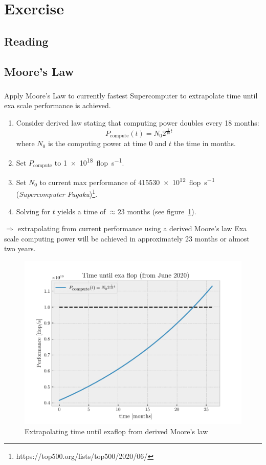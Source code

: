 \documentclass[]{scrartcl}
\newcommand{\exercise}{Exercise \thesection}
\begin{document}
\section*{\exercise}
\subsection{Reading}
\subsection{Moore's Law}
\subsubsection{}
Apply Moore's Law to currently fastest Supercomputer to extrapolate time until exa
scale performance is achieved.
\begin{enumerate}
	\item Consider derived law stating that computing power doubles every 18 months:
	\begin{equation}
		P_{\textrm{compute}}(t) = N_0 2^{\frac{1}{18} t}
	\end{equation}
	where $ N_0 $ is the computing power at time 0 and $ t $ the time in months.
	\item Set $ P_{\textrm{compute}} $ to \SI{1e18}{flop\per\second}.
	\item Set $ N_0 $ to current max performance of \SI{415530e12}{flop\per\second}
	(\emph{Supercomputer Fugaku})\footnote{https://top500.org/lists/top500/2020/06/}.
\item Solving for $ t $ yields a time of $ \approx23 $ months (see figure~\ref{fig:Moore}).
\end{enumerate}
$ \Rightarrow $ extrapolating from current performance using a derived Moore's law
Exa scale computing power will be achieved in approximately 23 months or almost two years.
\begin{figure}[htpb]
	\centering
	\includegraphics[width=0.8\linewidth]{./plots/Moore}
	\caption{Extrapolating time until exaflop from derived Moore's law}%
	\label{fig:Moore}
\end{figure}
\end{document}
